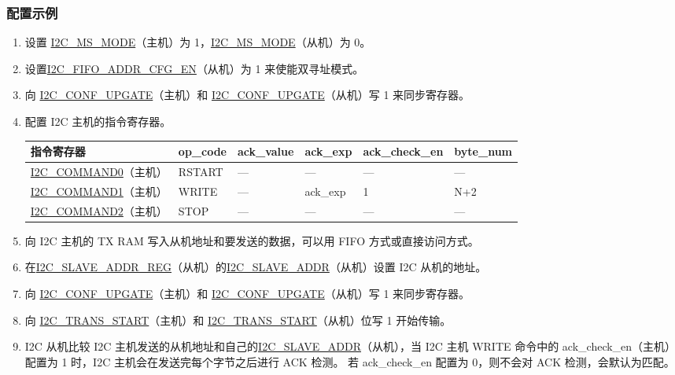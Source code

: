 \documentclass[main\_\_CN.tex]{subfiles}
\begin{document}
\subsubsection{配置示例}
\begin{enumerate}
\item 设置 \hyperref[fielddesc:I2CMSMODE]{I2C\_MS\_MODE}（主机）为 1，\hyperref[fielddesc:I2CMSMODE]{I2C\_MS\_MODE}（从机）为 0。
\item 设置\hyperref[fielddesc:I2CFIFOADDRCFGEN]{I2C\_FIFO\_ADDR\_CFG\_EN}（从机）为 1 来使能双寻址模式。
\item 向 \hyperref[fielddesc:I2CCONFUPGATE]{I2C\_CONF\_UPGATE}（主机）和 \hyperref[fielddesc:I2CCONFUPGATE]{I2C\_CONF\_UPGATE}（从机）写 1 来同步寄存器。
\item 配置 I2C 主机的指令寄存器。
\begin{longtable}{ | p{4cm} | p{2cm} | p{2cm} | p{2cm} |p{2cm} | p{2cm} |}
\hline\rowcolor{lightgray}
指令寄存器& op\_code & ack\_value&ack\_exp&ack\_check\_en&byte\_num  \\ \hline
\hyperref[fielddesc:I2CCOMMAND0]{I2C\_COMMAND0}（主机）& RSTART& ---&---&---&---  \\ \hline
\hyperref[fielddesc:I2CCOMMAND1]{I2C\_COMMAND1}（主机）& WRITE& ---&ack\_exp&1&N+2  \\ \hline
\hyperref[fielddesc:I2CCOMMAND2]{I2C\_COMMAND2}（主机）& STOP& ---&---&---&---  \\ \hline
\end{longtable}
\item 向 I2C 主机的 TX RAM 写入从机地址和要发送的数据，可以用 FIFO 方式或直接访问方式。
\item 在\hyperref[regdesc:I2CSLAVEADDRREG]{I2C\_SLAVE\_ADDR\_REG}（从机）的\hyperref[fielddesc:I2CSLAVEADDR]{I2C\_SLAVE\_ADDR}（从机）设置 I2C 从机的地址。
\item 向 \hyperref[fielddesc:I2CCONFUPGATE]{I2C\_CONF\_UPGATE}（主机）和 \hyperref[fielddesc:I2CCONFUPGATE]{I2C\_CONF\_UPGATE}（从机）写 1 来同步寄存器。
\item 向 \hyperref[fielddesc:I2CTRANSSTART]{I2C\_TRANS\_START}（主机）和 \hyperref[fielddesc:I2CTRANSSTART]{I2C\_TRANS\_START}（从机）位写 1 开始传输。
\item I2C 从机比较 I2C 主机发送的从机地址和自己的\hyperref[fielddesc:I2CSLAVEADDR]{I2C\_SLAVE\_ADDR}（从机），当 I2C 主机 WRITE 命令中的 ack\_check\_en（主机）配置为 1 时，I2C 主机会在发送完每个字节之后进行 ACK 检测。 若 ack\_check\_en 配置为 0，则不会对 ACK 检测，会默认为匹配。
\begin{itemize}

\end{itemize}
\end{enumerate}
\end{document}
